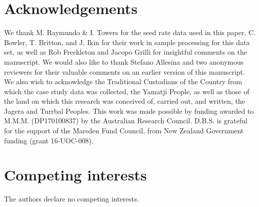 \documentclass[a4,12pt]{article}
\begin{document}
\begin{refsection}




\section*{Acknowledgements}

We thank M. Raymundo \& I. Towers for the seed rate data used in this paper, C. Bowler, T. Britton, and J. Ikin for their work in sample processing for this data set, as well as Rob Freckleton and Jacopo Grilli for insightful comments on the manuscript. We would also like to thank Stefano Allesina and two anonymous reviewers for their valuable comments on an earlier version of this manuscript. We also wish to acknowledge the Traditional Custodians of the Country from which the case study data was collected, the Yamatji People, as well as those of the land on which this research was conceived of, carried out, and written, the Jagera and Turrbal Peoples. This work was made possible by funding awarded to M.M.M. (DP170100837) by the Australian Research Council. D.B.S. is grateful for the support of the Marsden Fund Council, from New Zealand Government funding (grant 16-UOC-008).


\section*{Competing interests}

The authors declare no competing interests. 


\newpage

\printbibliography   

\end{refsection}

\newpage 
\end{document}
